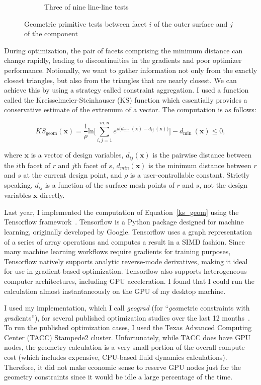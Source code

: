 \documentclass[11pt,letterpaper]{article}
\begin{document}
\begin{figure}[ht]
\begin{subfigure}[b]{0.48\textwidth}
    \caption{Three of nine line-line tests}
    \label{fig:line-line}
  \end{subfigure}
  \caption{Geometric primitive tests between facet $i$ of the outer surface and $j$ of the component}
  \label{fig:primitives}
\end{figure}

\qquad During optimization, the pair of facets comprising the minimum distance can change rapidly, leading to discontinuities in the gradients and poor optimizer performance.
Notionally, we want to gather information not only from the exactly closest triangles, but also from the triangles that are nearly closest.
We can achieve this by using a strategy called constraint aggregation.
I used a function called the Kreisselmeier-Steinhauser (KS) function which essentially provides a conservative estimate of the extremum of a vector.
The computation is as follows:

\begin{equation}
  \label{ks_geom}
  KS_\text{geom}(\textbf{x}) = \frac{1}{\rho} \textrm{ln} \Bigg[\sum_{i,j=1}^{m,n} e^{\rho\big(d_\text{min}\:(\textbf{x})-d_{ij}\:(\textbf{x})\big)}\Bigg] - d_\text{min}\:(\textbf{x}) \leq 0 ,
\end{equation}

where $\textbf{x}$ is a vector of design variables,
$d_{ij}(\textbf{x})$ is the pairwise distance between the $i$th facet of $r$ and $j$th facet of $s$,
$d_{min}(\textbf{x})$ is the minimum distance between $r$ and $s$ at the current design point, and
$\rho$ is a user-controllable constant.
Strictly speaking, $d_{ij}$ is a function of the surface mesh points of $r$ and $s$, not the design variables $\textbf{x}$ directly.

\qquad Last year, I implemented the computation of Equation~\ref{ks_geom} using the Tensorflow framework~\cite{tensorflow2015-whitepaper}. %
Tensorflow is a Python package designed for machine learning, originally developed by Google.
Tensorflow uses a graph representation of a series of array operations and computes a result in a SIMD fashion.
Since many machine learning workflows require gradients for training purposes, Tensorflow natively supports analytic reverse-mode derivatives, making it ideal for use in gradient-based optimization.
Tensorflow also supports heterogeneous computer architectures, including GPU acceleration.
I found that I could run the calculation almost instantaneously on the GPU of my desktop machine.

\qquad I used my implementation, which I call \emph{geograd} (for ``\emph{geo}metric constraints with \emph{grad}ients''), for several published optimization studies over the last 12 months~\cite{Brelje2019a,Brelje2019c}. %
To run the published optimization cases, I used the Texas Advanced Computing Center (TACC) Stampede2 cluster.
Unfortunately, while TACC does have GPU nodes, the geometry calculation is a very small portion of the overall compute cost (which includes expensive, CPU-based fluid dynamics calculations).
Therefore, it did not make economic sense to reserve GPU nodes just for the geometry constraints since it would be idle a large percentage of the time.
\end{document}
